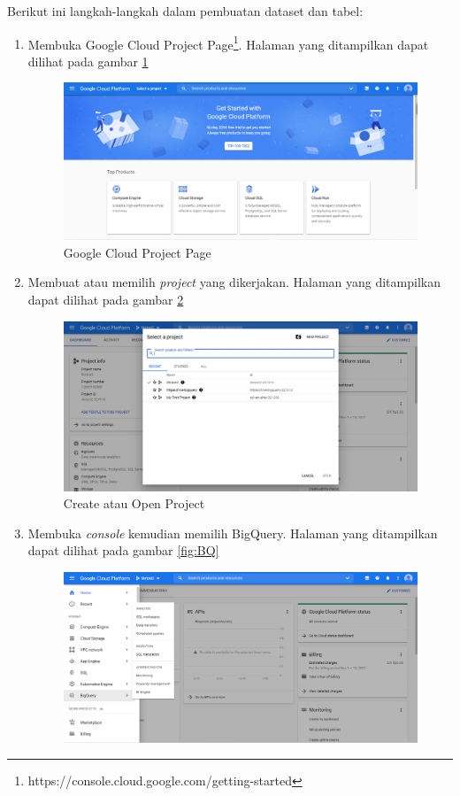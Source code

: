 Berikut ini langkah-langkah dalam pembuatan dataset dan tabel:
\begin{enumerate}
	\item Membuka Google Cloud Project Page\footnote{https://console.cloud.google.com/getting-started}. Halaman yang ditampilkan dapat dilihat pada gambar \ref{fig:GCP}
	\begin{figure}[H]
		\centering  
		\includegraphics[scale=0.45]{Gambar/open_GCP.PNG}  
		\caption{Google Cloud Project Page} 
		\label{fig:GCP} 
	\end{figure}
	\item Membuat atau memilih \textit{project} yang dikerjakan. Halaman yang ditampilkan dapat dilihat pada gambar \ref{fig:create_or_open}
	\begin{figure}[H]
		\centering  
		\includegraphics[scale=0.45]{Gambar/pilih_project.PNG}  
		\caption{Create atau Open Project} 
		\label{fig:create_or_open} 
	\end{figure}
	\item Membuka \textit{console} kemudian memilih BigQuery. Halaman yang ditampilkan dapat dilihat pada gambar \ref{fig:BQ}
	\begin{figure}[H]
		\centering  
		\includegraphics[scale=0.45]{Gambar/console_BigQuery.PNG}  

\end{figure}
\end{enumerate}
